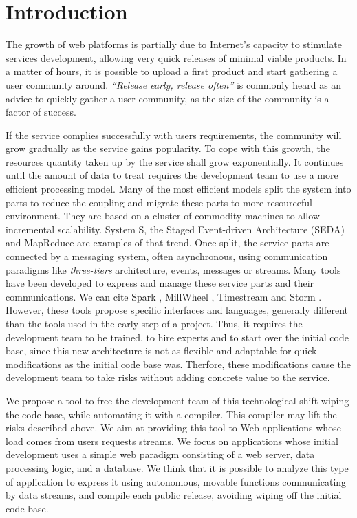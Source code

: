 \section{Introduction}


The growth of web platforms is partially due to Internet's capacity to stimulate services development, allowing very quick releases of minimal viable products.
In a matter of hours, it is possible to upload a first product and start gathering a user community around.
\textit{``Release early, release often''} is commonly heard as an advice to quickly gather a user community, as the size of the community is a factor of success.

If the service complies successfully with users requirements, the community will grow gradually as the service gains popularity.
To cope with this growth, the resources quantity taken up by the service shall grow exponentially.
It continues until the amount of data to treat requires the development team to use a more efficient processing model.  %
Many of the most efficient models split the system into parts to reduce the coupling and migrate these parts to more resourceful environment.
They are based on a cluster of commodity machines\cite{Fox1997} to allow incremental scalability.
System S\cite{Jain2006,Wu2007}, the Staged Event-driven Architecture (SEDA)\cite{Welsh2000} and MapReduce \cite{Dean2008} are examples of that trend.
Once split, the service parts are connected by a messaging system, often asynchronous, using communication paradigms like \textit{three-tiers} architecture, events, messages or streams.
Many tools have been developed to express and manage these service parts and their communications.
We can cite Spark \cite{Zaharia2010}, MillWheel \cite{Akidau2013}, Timestream \cite{Qian2013} and Storm \cite{Marz2011}.
However, these tools propose specific interfaces and languages, generally different than the tools used in the early step of a project.
Thus, it requires the development team to be trained, to hire experts and to start over the initial code base, since this new architecture is not as flexible and adaptable for quick modifications as the initial code base was.
Therfore, these modifications cause the development team to take risks without adding concrete value to the service.

We propose a tool to free the development team of this technological shift wiping the code base, while automating it with a compiler.
This compiler may lift the risks described above.
We aim at providing this tool to Web applications whose load comes from users requests streams.
We focus on applications whose initial development uses a simple web paradigm consisting of a web server, data processing logic, and a database.
We think that it is possible to analyze this type of application to express it using autonomous, movable functions communicating by data streams, and compile each public release, avoiding wiping off the initial code base.

